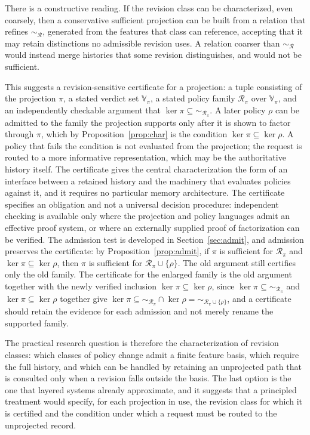 \documentclass[11pt]{article}
\theoremstyle{remark}
\newcommand{\Rev}{\mathcal{R}}
\newcommand{\Vset}{\mathbb{V}}
\renewcommand{\ker}{\operatorname{ker}}
\begin{document}
There is a constructive reading. If the revision class can be characterized, even coarsely, then a conservative sufficient projection can be built from a relation that refines $\sim_{\Rev}$, generated from the features that class can reference, accepting that it may retain distinctions no admissible revision uses. A relation coarser than $\sim_{\Rev}$ would instead merge histories that some revision distinguishes, and would not be sufficient.

This suggests a revision-sensitive certificate for a projection: a tuple consisting of the projection $\pi$, a stated verdict set $\Vset_\pi$, a stated policy family $\Rev_\pi$ over $\Vset_\pi$, and an independently checkable argument that $\ker\pi\subseteq{\sim_{\Rev_\pi}}$. A later policy $\rho$ can be admitted to the family the projection supports only after it is shown to factor through $\pi$, which by Proposition~\ref{prop:char} is the condition $\ker\pi\subseteq\ker\rho$. A policy that fails the condition is not evaluated from the projection; the request is routed to a more informative representation, which may be the authoritative history itself. The certificate gives the central characterization the form of an interface between a retained history and the machinery that evaluates policies against it, and it requires no particular memory architecture. The certificate specifies an obligation and not a universal decision procedure: independent checking is available only where the projection and policy languages admit an effective proof system, or where an externally supplied proof of factorization can be verified. The admission test is developed in Section~\ref{sec:admit}, and admission preserves the certificate: by Proposition~\ref{prop:admit}, if $\pi$ is sufficient for $\Rev_\pi$ and $\ker\pi\subseteq\ker\rho$, then $\pi$ is sufficient for $\Rev_\pi\cup\{\rho\}$. The old argument still certifies only the old family. The certificate for the enlarged family is the old argument together with the newly verified inclusion $\ker\pi\subseteq\ker\rho$, since $\ker\pi\subseteq{\sim_{\Rev_\pi}}$ and $\ker\pi\subseteq\ker\rho$ together give $\ker\pi\subseteq{\sim_{\Rev_\pi}}\cap\ker\rho={\sim_{\Rev_\pi\cup\{\rho\}}}$, and a certificate should retain the evidence for each admission and not merely rename the supported family.

The practical research question is therefore the characterization of revision classes: which classes of policy change admit a finite feature basis, which require the full history, and which can be handled by retaining an unprojected path that is consulted only when a revision falls outside the basis. The last option is the one that layered systems already approximate, and it suggests that a principled treatment would specify, for each projection in use, the revision class for which it is certified and the condition under which a request must be routed to the unprojected record.
\end{document}
